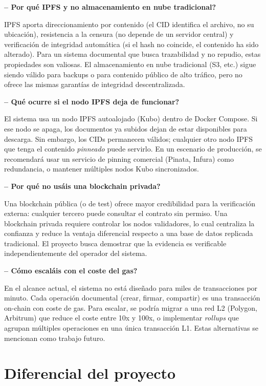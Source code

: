\documentclass[11pt, a4paper]{article}
\begin{document}
\textbf{-- \textquestiondown Por qu\'e IPFS y no almacenamiento en nube tradicional?}

IPFS aporta direccionamiento por contenido (el CID identifica el archivo, no su ubicaci\'on), resistencia a la censura (no depende de un servidor central) y verificaci\'on de integridad autom\'atica (si el hash no coincide, el contenido ha sido alterado). Para un sistema documental que busca trazabilidad y no repudio, estas propiedades son valiosas. El almacenamiento en nube tradicional (S3, etc.) sigue siendo v\'alido para backups o para contenido p\'ublico de alto tr\'afico, pero no ofrece las mismas garant\'ias de integridad descentralizada.

\textbf{-- \textquestiondown Qu\'e ocurre si el nodo IPFS deja de funcionar?}

El sistema usa un nodo IPFS autoalojado (Kubo) dentro de Docker Compose. Si ese nodo se apaga, los documentos ya subidos dejan de estar disponibles para descarga. Sin embargo, los CIDs permanecen v\'alidos; cualquier otro nodo IPFS que tenga el contenido \textit{pinneado} puede servirlo. En un escenario de producci\'on, se recomendar\'a usar un servicio de pinning comercial (Pinata, Infura) como redundancia, o mantener m\'ultiples nodos Kubo sincronizados.

\textbf{-- \textquestiondown Por qu\'e no us\'ais una blockchain privada?}

Una blockchain p\'ublica (o de test) ofrece mayor credibilidad para la verificaci\'on externa: cualquier tercero puede consultar el contrato sin permiso. Una blockchain privada requiere controlar los nodos validadores, lo cual centraliza la confianza y reduce la ventaja diferencial respecto a una base de datos replicada tradicional. El proyecto busca demostrar que la evidencia es verificable independientemente del operador del sistema.

\textbf{-- \textquestiondown C\'omo escal\'ais con el coste del gas?}

En el alcance actual, el sistema no est\'a dise\~nado para miles de transacciones por minuto. Cada operaci\'on documental (crear, firmar, compartir) es una transacci\'on on-chain con coste de gas. Para escalar, se podr\'ia migrar a una red L2 (Polygon, Arbitrum) que reduce el coste entre 10x y 100x, o implementar \textit{rollups} que agrupan m\'ultiples operaciones en una \'unica transacci\'on L1. Estas alternativas se mencionan como trabajo futuro.

\section{Diferencial del proyecto}
\end{document}
